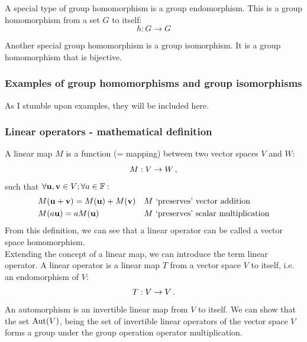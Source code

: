            A special type of group homomorphism is a group endomorphism. This is a group homomorphism from a set $G$ to itself:
            \begin{equation}
                h: G \rightarrow G
            \end{equation}

            Another special group homomorphism is a group isomorphism. It is a group homomorphism that is bijective. \\

        \subsubsection{Examples of group homomorphisms and group isomorphisms}
            As I stumble upon examples, they will be included here.

        \subsubsection{Linear operators - mathematical definition}
            A linear map $M$ is a function (= mapping) between two vector spaces $V$ and $W$:
            \begin{equation}
                M: V \rightarrow W \thinspace ,
            \end{equation}
            such that $\forall \vb{u}, \vb{v} \in V; \forall a \in \mathbb{F}:$
            \begin{align}
                &M(\vb{u} + \vb{v}) = M(\vb{u}) + M(\vb{v})     && \text{$M$ `preserves' vector addition} \\
                &M(a \vb{u}) = a M(\vb{u})                      && \text{$M$ `preserves' scalar multiplication}
            \end{align}
            From this definition, we can see that a linear operator can be called a vector space homomorphism. \\

            Extending the concept of a linear map, we can introduce the term linear operator. A linear operator is a linear map $T$ from a vector space $V$ to itself, i.e. an endomorphism of $V$:
            \begin{equation}
                T: V \rightarrow V \thinspace .
            \end{equation}
            An automorphism is an invertible linear map from $V$ to itself. We can show that the set $\operatorname{Aut}(V)$, being the set of invertible linear operators of the vector space $V$ forms a group under the group operation operator multiplication.

